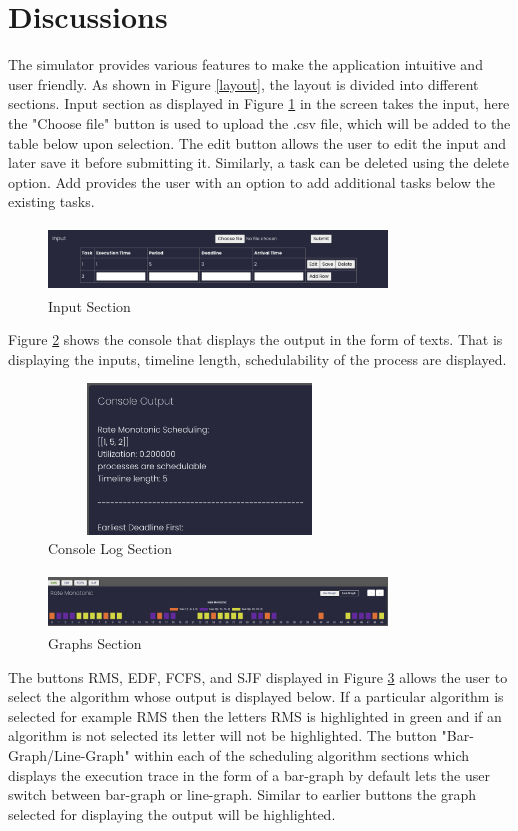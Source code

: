 \documentclass[12pt, conference]{IEEEtran}
\begin{document}
\section{Discussions}
The simulator provides various features to make the application intuitive and user friendly. As shown in Figure \ref{layout}, the layout is divided into different sections. Input section as displayed in Figure \ref{inputSection} in the screen takes the input, here the "Choose file" button is used to upload the .csv file, which will be added to the table below upon selection. The edit button allows the user to edit the input and later save it before submitting it. Similarly, a task can be deleted using the delete option. Add provides the user with an option to add additional tasks below the existing tasks.
\begin{figure}
\centerline{\includegraphics[width=9cm, height=1.75cm]{inputDiscussion.png}}
\caption{Input Section}
\label{inputSection}
\end{figure} 
Figure \ref{console} shows the console that displays the output in the form of texts. That is displaying the inputs, timeline length, schedulability of the process are displayed. 
\begin{figure}
\centerline{\includegraphics[width=8cm, height=4cm]{outputDiscussion.png}}
\caption{Console Log Section}
\label{console}
\end{figure} 
\begin{figure}
\centerline{\includegraphics[width=9cm, height=1.5cm]{barGraphDiscussion.png}}
\caption{Graphs Section}
\label{graphs}
\end{figure} 
The buttons RMS, EDF, FCFS, and SJF displayed in Figure \ref{graphs} allows the user to select the algorithm whose output is displayed below. If a particular algorithm is selected for example RMS then the letters RMS is highlighted in green and if an algorithm is not selected its letter will not be highlighted. The button "Bar-Graph/Line-Graph" within each of the scheduling algorithm sections which displays the execution trace in the form of a bar-graph by default lets the user switch between bar-graph or line-graph. Similar to earlier buttons the graph selected for displaying the output will be highlighted.
\end{document}
